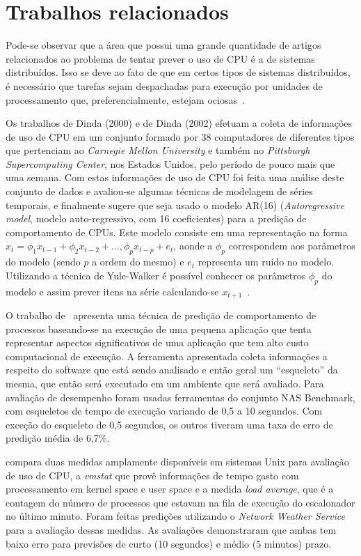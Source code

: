 %
%

\chapter{Trabalhos relacionados}

Pode-se observar que a área que possui uma grande quantidade de artigos
relacionados ao problema de tentar prever o uso de CPU é a de sistemas
distribuídos. Isso se deve ao fato de que em certos tipos de sistemas
distribuídos, é necessário que tarefas sejam despachadas para execução por
unidades de processamento que, preferencialmente, estejam ociosas~\cite{zhang2007cpu}.

Os trabalhos de Dinda (2000)\nocite{dinda2000host} e de Dinda
(2002)\nocite{dinda2002evaluation} efetuam a coleta de informações de uso de
CPU em um conjunto formado por 38 computadores de diferentes tipos que
pertenciam ao \emph{Carnegie Mellon University} e também no \emph{Pittsburgh
Supercomputing Center}, nos Estados Unidos, pelo período de pouco mais que uma
semana. Com estas informações de uso de CPU foi feita uma análise deste conjunto
de dados e avaliou-se algumas técnicas de modelagem de séries temporais, e
finalmente sugere que seja usado o modelo AR(16) (\emph{Autoregressive model},
modelo auto-regressivo, com 16 coeficientes) para a predição de comportamento
de CPUs. Este modelo consiste em uma representação na forma
$x_t = \phi_{1}x_{t-1} + \phi_{2}x_{t-2}+\dotsc,\phi_{p}x_{t-p}+e_t$, aonde a
$\phi_p$ correspondem aos parâmetros do modelo (sendo $p$ a ordem do mesmo) e
$e_t$ representa um ruído no modelo. Utilizando a técnica de Yule-Walker é
possível conhecer os parâmetros $\phi_p$ do modelo e assim prever itens na
série calculando-se $x_{t+1}$~\cite{baddour2005autoregressive}.

O trabalho de~ apresenta uma técnica de
predição de comportamento de processos baseando-se na execução de uma pequena
aplicação que tenta representar aspectos significativos de uma aplicação que
tem alto custo computacional de execução. A ferramenta apresentada coleta
informações a respeito do software que está sendo analisado e então geral um
“esqueleto” da mesma, que então será executado em um ambiente que será
avaliado. Para avaliação de desempenho foram usadas ferramentas do conjunto NAS
Benchmark, com esqueletos de tempo de execução variando de 0,5 a 10 segundos.
Com exceção do esqueleto de 0,5 segundos, os outros tiveram uma taxa de erro de
predição média de 6,7\%. 

 compara duas medidas amplamente disponíveis
em sistemas Unix para avaliação de uso de CPU, a \emph{vmstat} que provê
informações de tempo gasto com processamento em kernel space e user space e a
medida \emph{load average}, que é a contagem do número de processos que estavam
na fila de execução do escalonador no último minuto. Foram feitas predições
utilizando o \emph{Network Weather Service} \cite{wolski1999network} para a
avaliação dessas medidas. As avaliações demonstraram que ambas tem baixo erro
para previsões de curto (10 segundos) e médio (5 minutos) prazo.

